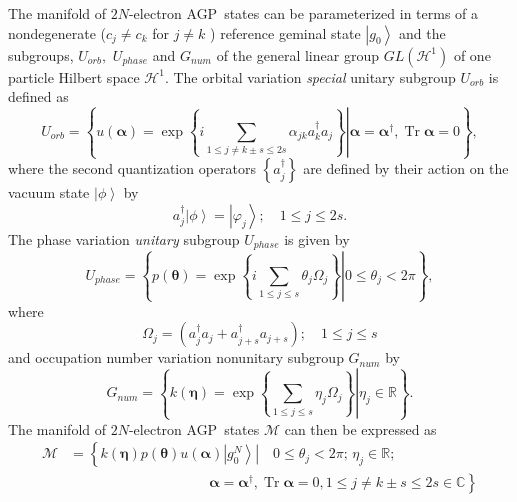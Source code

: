 \documentclass[aps,preprint]{revtex4}%
\begin{document}
The manifold of $2N$-electron AGP\ states can be parameterized in terms of a
nondegenerate ($c_{j}\neq c_{k}$ for $j\neq k$ ) reference geminal state
$\left\vert g_{0}\right\rangle $ and the subgroups, $U_{orb},$ $U_{phase}$ and
$G_{num}$ of the general linear group $GL\left(  \mathcal{H}^{1}\right)  $ of
one particle Hilbert space $\mathcal{H}^{1}$. The orbital variation
\emph{special} unitary subgroup $U_{orb}$ is defined as
\begin{equation}
U_{orb}=\left\{  \left.  u\left(  \bm{\alpha}\right)  =\exp\left\{
i\sum_{1\leq j\neq k\pm s\leq2s}\alpha_{jk}a_{k}^{\dagger}a_{j}\right\}
\right\vert \bm{\alpha}=\bm{\alpha}^{\dagger},\operatorname{Tr}%
\bm{\alpha}=0\right\}  , \label{orb}%
\end{equation}
where the second quantization operators $\left\{  a_{j}^{\dagger}\right\}  $
are defined by their action on the vacuum state $\left\vert \phi\right\rangle
$ by
\begin{equation}
a_{j}^{\dagger}\left\vert \phi\right\rangle =\left\vert \varphi_{j}%
\right\rangle ;\quad1\leq j\leq2s.
\end{equation}
The phase variation \emph{unitary} subgroup $U_{phase}$ is given by%
\begin{equation}
U_{phase}=\left\{  \left.  p\left(  \bm{\theta}\right)  =\exp\left\{
i\sum_{1\leq j\leq s}\theta_{j}\Omega_{j}\right\}  \right\vert 0\leq\theta
_{j}<2\pi\right\}  , \label{phase}%
\end{equation}
where
\begin{equation}
\Omega_{j}=\left(  a_{j}^{\dagger}a_{j}+a_{j+s}^{\dagger}a_{j+s}\right)
;\quad1\leq j\leq s
\end{equation}
and occupation number variation nonunitary subgroup $G_{num}$ by
\begin{equation}
G_{num}=\left\{  \left.  k\left(  \bm{\eta}\right)  =\exp\left\{  \sum_{1\leq
j\leq s}\eta_{j}\Omega_{j}\right\}  \right\vert \eta_{j}\in\mathbb{R}\right\}
. \label{occup}%
\end{equation}
The manifold of $2N$-electron AGP\ states $\mathcal{M}$ can then be expressed
as
\begin{align}
\mathcal{M}  &  \mathcal{=}\left\{  \left.  \overset{}{k\left(
\bm{\eta}\right)  p\left(  \bm{\theta}\right)  u\left(  \bm{\alpha}\right)
}\left\vert g_{0}^{N}\right\rangle \right\vert \quad0\leq\theta_{j}%
<2\pi;\,\eta_{j}\in\mathbb{R};\right. \nonumber\\
&  \qquad\qquad\qquad\qquad\qquad\left.  \bm{\alpha}=\bm{\alpha }^{\dagger
},\operatorname{Tr}\bm{\alpha}=0,1\leq j\neq k\pm s\leq2s\in\mathbb{C}%
\right\}
\end{align}
\end{document}
